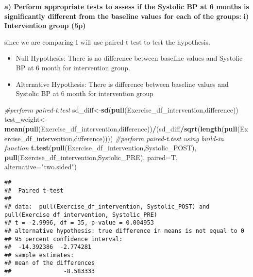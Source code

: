 \documentclass[]{article}
\newenvironment{Shaded}{\begin{snugshade}}{\end{snugshade}}
\newcommand{\CommentTok}[1]{\textcolor[rgb]{0.56,0.35,0.01}{\textit{#1}}}
\newcommand{\DataTypeTok}[1]{\textcolor[rgb]{0.13,0.29,0.53}{#1}}
\newcommand{\DecValTok}[1]{\textcolor[rgb]{0.00,0.00,0.81}{#1}}
\newcommand{\KeywordTok}[1]{\textcolor[rgb]{0.13,0.29,0.53}{\textbf{#1}}}
\newcommand{\NormalTok}[1]{#1}
\newcommand{\OperatorTok}[1]{\textcolor[rgb]{0.81,0.36,0.00}{\textbf{#1}}}
\newcommand{\StringTok}[1]{\textcolor[rgb]{0.31,0.60,0.02}{#1}}
\providecommand{\tightlist}{%
  \setlength{\itemsep}{0pt}\setlength{\parskip}{0pt}}
\begin{document}
\textbf{a) Perform appropriate tests to assess if the Systolic BP at 6
months is significantly different from the baseline values for each of
the groups:} \textbf{i) Intervention group (5p)}

since we are comparing I will use paired-t test to test the hypothesis.

\begin{itemize}
\tightlist
\item
  Null Hypothesis: There is no difference between baseline values and
  Systolic BP at 6 month for intervention group.
\item
  Alternative Hypothesis: There is difference between baseline values
  and Systolic BP at 6 month for intervention group
\end{itemize}

\begin{Shaded}
\end{Shaded}

\begin{Shaded}
\begin{Highlighting}[]
\CommentTok{#perform paired-t.test}
\NormalTok{sd_diff<-}\KeywordTok{sd}\NormalTok{(}\KeywordTok{pull}\NormalTok{(Exercise_df_intervention,difference))}
\NormalTok{test_weight<-}\KeywordTok{mean}\NormalTok{(}\KeywordTok{pull}\NormalTok{(Exercise_df_intervention,difference))}\OperatorTok{/}\NormalTok{(sd_diff}\OperatorTok{/}\KeywordTok{sqrt}\NormalTok{(}\KeywordTok{length}\NormalTok{(}\KeywordTok{pull}\NormalTok{(Exercise_df_intervention,difference))))}
\CommentTok{#perform paired-t.test using build-in function}
\KeywordTok{t.test}\NormalTok{(}\KeywordTok{pull}\NormalTok{(Exercise_df_intervention,Systolic_POST), }\KeywordTok{pull}\NormalTok{(Exercise_df_intervention,Systolic_PRE), }\DataTypeTok{paired=}\NormalTok{T, }\DataTypeTok{alternative=}\StringTok{"two.sided"}\NormalTok{)}
\end{Highlighting}
\end{Shaded}

\begin{verbatim}
## 
##  Paired t-test
## 
## data:  pull(Exercise_df_intervention, Systolic_POST) and pull(Exercise_df_intervention, Systolic_PRE)
## t = -2.9996, df = 35, p-value = 0.004953
## alternative hypothesis: true difference in means is not equal to 0
## 95 percent confidence interval:
##  -14.392386  -2.774281
## sample estimates:
## mean of the differences 
##               -8.583333
\end{verbatim}
\end{document}
